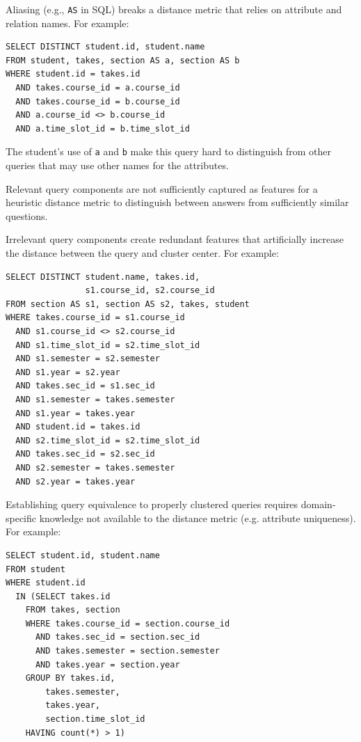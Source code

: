 \smallskip
{} Aliasing (e.g., \texttt{AS} in SQL) breaks a distance metric that relies on attribute and relation names.
For example:
{\footnotesize
\begin{verbatim}
SELECT DISTINCT student.id, student.name
FROM student, takes, section AS a, section AS b
WHERE student.id = takes.id
  AND takes.course_id = a.course_id
  AND takes.course_id = b.course_id
  AND a.course_id <> b.course_id
  AND a.time_slot_id = b.time_slot_id
\end{verbatim}
}

The student's use of \texttt{a} and \texttt{b} make this query hard to distinguish from other queries that may use other names for the attributes.

\smallskip
{} Relevant query components are not sufficiently captured as features for a heuristic distance metric to distinguish between answers from sufficiently similar questions.

\smallskip
{} Irrelevant query components create redundant features that artificially increase the distance between the query and cluster center.
For example:
{\footnotesize
\begin{verbatim}
SELECT DISTINCT student.name, takes.id, 
                s1.course_id, s2.course_id
FROM section AS s1, section AS s2, takes, student
WHERE takes.course_id = s1.course_id
  AND s1.course_id <> s2.course_id
  AND s1.time_slot_id = s2.time_slot_id
  AND s1.semester = s2.semester
  AND s1.year = s2.year
  AND takes.sec_id = s1.sec_id
  AND s1.semester = takes.semester
  AND s1.year = takes.year
  AND student.id = takes.id
  AND s2.time_slot_id = s2.time_slot_id
  AND takes.sec_id = s2.sec_id
  AND s2.semester = takes.semester
  AND s2.year = takes.year
\end{verbatim}
}

\smallskip
{} Establishing query equivalence to properly clustered queries requires domain-specific knowledge not available to the distance metric (e.g. attribute uniqueness).
For example:
{\footnotesize
\begin{verbatim}
SELECT student.id, student.name
FROM student
WHERE student.id
  IN (SELECT takes.id
    FROM takes, section
    WHERE takes.course_id = section.course_id
      AND takes.sec_id = section.sec_id
      AND takes.semester = section.semester
      AND takes.year = section.year
    GROUP BY takes.id,
        takes.semester,
        takes.year,
        section.time_slot_id
    HAVING count(*) > 1)
\end{verbatim}
}

